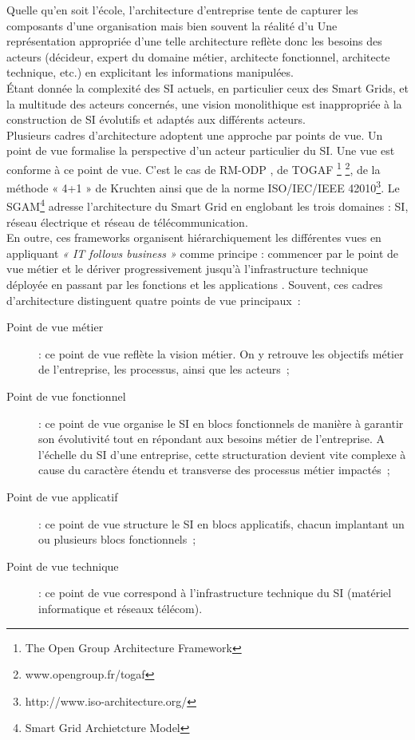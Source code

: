Quelle qu'en soit l'école, l'architecture d'entreprise tente de capturer les 
composants d'une organisation mais bien souvent la réalité d'u 
Une représentation appropriée d'une telle architecture reflète donc les besoins 
des acteurs (décideur, expert du domaine métier, architecte fonctionnel, 
architecte technique, etc.) en explicitant les informations manipulées.  
\\Étant donnée la complexité des SI actuels, en particulier ceux des Smart 
Grids, et la multitude des acteurs concernés, une vision monolithique est 
inappropriée à la construction de SI évolutifs et adaptés aux différents 
acteurs.
\\Plusieurs cadres d'architecture adoptent une approche par points de vue. Un 
point de vue formalise la perspective d'un acteur particulier du SI. Une vue est 
conforme à ce point de vue. C'est le cas de RM-ODP \cite{raymond1995reference}, 
de TOGAF \footnote{The Open Group Architecture Framework} 
\footnote{www.opengroup.fr/togaf}, de la méthode « 4+1 » de Kruchten 
\cite{kruchten19954+} ainsi que de la norme ISO/IEC/IEEE 
42010\footnote{http://www.iso-architecture.org/}. Le SGAM\footnote{Smart Grid 
Archietcture Model} \cite{uslar2012standardization} adresse l'architecture du 
Smart Grid en englobant les trois domaines : SI, réseau électrique et réseau de 
télécommunication. 
\\En outre, ces frameworks organisent hiérarchiquement les différentes vues en 
appliquant \emph{« IT follows business »} comme principe : commencer par le 
point de vue métier et le dériver progressivement jusqu'à l'infrastructure 
technique déployée en passant par les fonctions et les applications 
\cite{winter2006essential}. 
Souvent, ces cadres d'architecture distinguent quatre points de vue principaux~:
\begin{description}
\item[Point de vue métier]  : ce point de vue reflète la vision métier. On y 
retrouve les objectifs métier de l'entreprise, les processus, ainsi que les 
acteurs~;
\item[Point de vue fonctionnel] : ce point de vue organise le SI en blocs 
fonctionnels de manière à garantir son évolutivité tout en répondant aux besoins 
métier de l'entreprise. A l'échelle du SI d'une entreprise, cette structuration 
devient vite complexe à cause du caractère étendu et transverse des processus 
métier impactés~;
\item[Point de vue applicatif] : ce point de vue structure le SI en blocs 
applicatifs, chacun implantant un ou plusieurs blocs fonctionnels~;
\item[Point de vue technique] : ce point de vue correspond à l'infrastructure 
technique du SI (matériel informatique et réseaux télécom).
\end{description}




